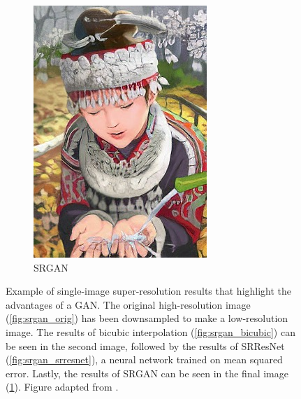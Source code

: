 \documentclass[a4paper]{book}
\begin{document}
\begin{figure}[t]
\begin{subfigure}{.24\linewidth}
        \includegraphics[width=\linewidth]{images/comic_SRGAN-VGG54.jpg}
        \caption{SRGAN}
        \label{fig:srgan_srgan}
    \end{subfigure}

    \caption{Example of single-image super-resolution results that highlight the advantages of a GAN. The original high-resolution image (\ref{fig:srgan_orig}) has been downsampled to make a low-resolution image. The results of bicubic interpolation (\ref{fig:srgan_bicubic}) can be seen in the second image, followed by the results of SRResNet (\ref{fig:srgan_srresnet}), a neural network trained on mean squared error. Lastly, the results of SRGAN can be seen in the final image (\ref{fig:srgan_srgan}). Figure adapted from \textcite{ledig_photo-realistic_2016}.}
    \label{fig:srgan}
\end{figure}
\end{document}

